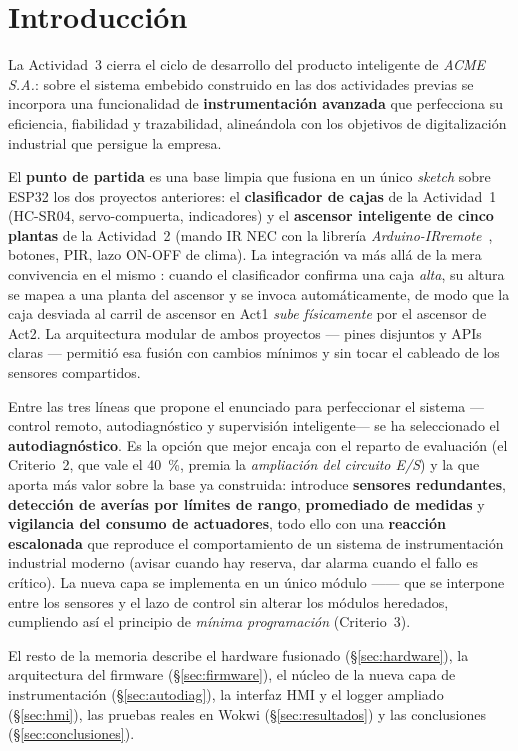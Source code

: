 \section{Introducción}
\label{sec:intro}

La Actividad~3 cierra el ciclo de desarrollo del producto inteligente de
\emph{ACME\,S.A.}: sobre el sistema embebido construido en las dos actividades
previas se incorpora una funcionalidad de \textbf{instrumentación avanzada}
que perfecciona su eficiencia, fiabilidad y trazabilidad, alineándola con los
objetivos de digitalización industrial que persigue la empresa.

El \textbf{punto de partida} es una base limpia que fusiona en un único
\emph{sketch} sobre ESP32 los dos proyectos anteriores: el \textbf{clasificador
de cajas} de la Actividad~1 (HC-SR04, servo-compuerta, indicadores) y el
\textbf{ascensor inteligente de cinco plantas} de la Actividad~2 (mando IR
NEC con la librería \emph{Arduino-IRremote}~\cite{irremote_gh}, botones, PIR,
lazo ON-OFF de clima). La integración va más allá de la mera
convivencia en el mismo : cuando el clasificador confirma una
caja \emph{alta}, su altura se mapea a una planta del ascensor y se invoca
 automáticamente, de modo que la caja desviada al
carril de ascensor en Act1 \emph{sube físicamente} por el ascensor de Act2. La
arquitectura modular de ambos proyectos --- pines disjuntos y APIs claras ---
permitió esa fusión con cambios mínimos y sin tocar el cableado de los
sensores compartidos.

Entre las tres líneas que propone el enunciado para perfeccionar el sistema
---control remoto, autodiagnóstico y supervisión inteligente--- se ha
seleccionado el \textbf{autodiagnóstico}. Es la opción que mejor encaja con
el reparto de evaluación (el Criterio~2, que vale el \SI{40}{\percent}, premia
la \emph{ampliación del circuito E/S}) y la que aporta más valor sobre la base
ya construida: introduce \textbf{sensores redundantes}, \textbf{detección de
averías por límites de rango}, \textbf{promediado de medidas} y
\textbf{vigilancia del consumo de actuadores}, todo ello con una
\textbf{reacción escalonada} que reproduce el comportamiento de un sistema de
instrumentación industrial moderno (avisar cuando hay reserva, dar alarma
cuando el fallo es crítico). La nueva capa se implementa en un único módulo
------ que se interpone entre los sensores y el lazo de
control sin alterar los módulos heredados, cumpliendo así el principio de
\emph{mínima programación} (Criterio~3).

El resto de la memoria describe el hardware fusionado (§\ref{sec:hardware}),
la arquitectura del firmware (§\ref{sec:firmware}), el núcleo de la nueva
capa de instrumentación (§\ref{sec:autodiag}), la interfaz HMI y el logger
ampliado (§\ref{sec:hmi}), las pruebas reales en Wokwi (§\ref{sec:resultados})
y las conclusiones (§\ref{sec:conclusiones}).
